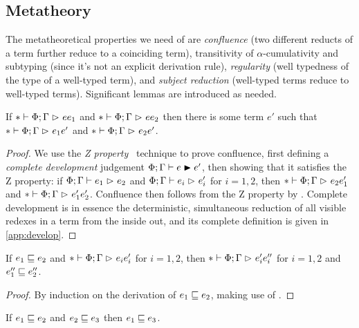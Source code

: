 \documentclass[acmsmall,review,anonymous]{acmart}\settopmatter{printfolios=true,printccs=false,printacmref=false}
\begin{document}
\subsection{Metatheory}

The metatheoretical properties we need of \lang are
\emph{confluence} (two different reducts of a term further reduce to a coinciding term),
transitivity of $\alpha$-cumulativity and subtyping (since it's not an explicit derivation rule),
\emph{regularity} (well typedness of the type of a well-typed term),
and \emph{subject reduction} (well-typed terms reduce to well-typed terms).
Significant lemmas are introduced as needed.

\begin{theorem}[Confluence] \label{thm:confluence}
If $* \mathrel{\vdash} \Phi; \Gamma \mathrel{\rhd}_{} e{e_1}$ and $* \mathrel{\vdash} \Phi; \Gamma \mathrel{\rhd}_{} e{e_2}$
then there is some term $e'$ such that
$* \mathrel{\vdash} \Phi; \Gamma \mathrel{\rhd}_{} e_1{e'}$ and $* \mathrel{\vdash} \Phi; \Gamma \mathrel{\rhd}_{} e_2{e'}$.
\end{theorem}

\begin{proof}
We use the \emph{Z property}~\citep{Z, confluence} technique to prove confluence,
first defining a \emph{complete development} judgement $\Phi; \Gamma \mathrel{\vdash} e \mathrel{\blacktriangleright} e'$,
then showing that it satisfies the Z property:
if $\Phi; \Gamma \mathrel{\vdash} e_1 \mathrel{\rhd}_{} e_2$ and $\Phi; \Gamma \mathrel{\vdash} e_i \mathrel{\rhd}_{} e'_i$ for $i = 1, 2$,
then $* \mathrel{\vdash} \Phi; \Gamma \mathrel{\rhd}_{} e_2{e'_1}$ and $* \mathrel{\vdash} \Phi; \Gamma \mathrel{\rhd}_{} e'_1{e'_2}$.
Confluence then follows from the Z property by \opcit.
Complete development is in essence the deterministic, simultaneous reduction
of all visible redexes in a term from the inside out,
and its complete definition is given in \cref{app:develop}.
\end{proof}

\begin{theorem} \label{thm:confluence-acum}
If $e_1 \mathrel{\sqsubseteq} e_2$ and $* \mathrel{\vdash} \Phi; \Gamma \mathrel{\rhd}_{} e_i{e'_i}$ for $i = 1, 2$,
then $* \mathrel{\vdash} \Phi; \Gamma \mathrel{\rhd}_{} e'_i{e''_i}$ for $i = 1, 2$ and $e''_1 \mathrel{\sqsubseteq} e''_2$.
\end{theorem}

\begin{proof}
By induction on the derivation of $e_1 \mathrel{\sqsubseteq} e_2$,
making use of .
\end{proof}

\begin{lemma} \label{lem:acum-trans}
If $e_1 \mathrel{\sqsubseteq} e_2$ and $e_2 \mathrel{\sqsubseteq} e_3$ then $e_1 \mathrel{\sqsubseteq} e_3$.
\end{lemma}
\end{document}

